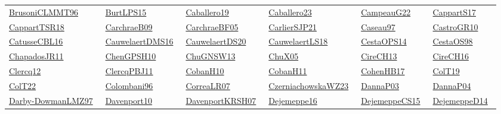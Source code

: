 \begin{longtable}{*{6}{l}}
\href{works/BrusoniCLMMT96.pdf}{BrusoniCLMMT96}~\cite{BrusoniCLMMT96} & \href{works/BurtLPS15.pdf}{BurtLPS15}~\cite{BurtLPS15} & \href{works/Caballero19.pdf}{Caballero19}~\cite{Caballero19} & \href{works/Caballero23.pdf}{Caballero23}~\cite{Caballero23} & \href{works/CampeauG22.pdf}{CampeauG22}~\cite{CampeauG22} & \href{works/CappartS17.pdf}{CappartS17}~\cite{CappartS17}\\ 
\href{works/CappartTSR18.pdf}{CappartTSR18}~\cite{CappartTSR18} & \href{works/CarchraeB09.pdf}{CarchraeB09}~\cite{CarchraeB09} & \href{works/CarchraeBF05.pdf}{CarchraeBF05}~\cite{CarchraeBF05} & \href{}{CarlierSJP21}~\cite{CarlierSJP21} & \href{works/Caseau97.pdf}{Caseau97}~\cite{Caseau97} & \href{}{CastroGR10}~\cite{CastroGR10}\\ 
\href{works/CatusseCBL16.pdf}{CatusseCBL16}~\cite{CatusseCBL16} & \href{works/CauwelaertDMS16.pdf}{CauwelaertDMS16}~\cite{CauwelaertDMS16} & \href{works/CauwelaertDS20.pdf}{CauwelaertDS20}~\cite{CauwelaertDS20} & \href{works/CauwelaertLS18.pdf}{CauwelaertLS18}~\cite{CauwelaertLS18} & \href{}{CestaOPS14}~\cite{CestaOPS14} & \href{works/CestaOS98.pdf}{CestaOS98}~\cite{CestaOS98}\\ 
\href{works/ChapadosJR11.pdf}{ChapadosJR11}~\cite{ChapadosJR11} & \href{works/ChenGPSH10.pdf}{ChenGPSH10}~\cite{ChenGPSH10} & \href{works/ChuGNSW13.pdf}{ChuGNSW13}~\cite{ChuGNSW13} & \href{works/ChuX05.pdf}{ChuX05}~\cite{ChuX05} & \href{works/CireCH13.pdf}{CireCH13}~\cite{CireCH13} & \href{}{CireCH16}~\cite{CireCH16}\\ 
\href{works/Clercq12.pdf}{Clercq12}~\cite{Clercq12} & \href{works/ClercqPBJ11.pdf}{ClercqPBJ11}~\cite{ClercqPBJ11} & \href{works/CobanH10.pdf}{CobanH10}~\cite{CobanH10} & \href{works/CobanH11.pdf}{CobanH11}~\cite{CobanH11} & \href{works/CohenHB17.pdf}{CohenHB17}~\cite{CohenHB17} & \href{works/ColT19.pdf}{ColT19}~\cite{ColT19}\\ 
\href{works/ColT22.pdf}{ColT22}~\cite{ColT22} & \href{works/Colombani96.pdf}{Colombani96}~\cite{Colombani96} & \href{}{CorreaLR07}~\cite{CorreaLR07} & \href{works/CzerniachowskaWZ23.pdf}{CzerniachowskaWZ23}~\cite{CzerniachowskaWZ23} & \href{works/DannaP03.pdf}{DannaP03}~\cite{DannaP03} & \href{}{DannaP04}~\cite{DannaP04}\\ 
\href{works/Darby-DowmanLMZ97.pdf}{Darby-DowmanLMZ97}~\cite{Darby-DowmanLMZ97} & \href{works/Davenport10.pdf}{Davenport10}~\cite{Davenport10} & \href{works/DavenportKRSH07.pdf}{DavenportKRSH07}~\cite{DavenportKRSH07} & \href{works/Dejemeppe16.pdf}{Dejemeppe16}~\cite{Dejemeppe16} & \href{works/DejemeppeCS15.pdf}{DejemeppeCS15}~\cite{DejemeppeCS15} & \href{works/DejemeppeD14.pdf}{DejemeppeD14}~\cite{DejemeppeD14}\\ 

\end{longtable}
